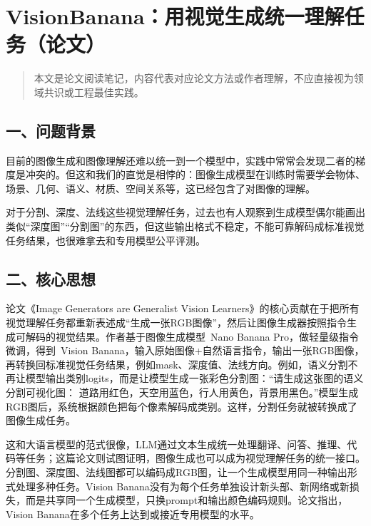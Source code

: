 \hypertarget{visionbananaux7528ux89c6ux89c9ux751fux6210ux7edfux4e00ux7406ux89e3ux4efbux52a1ux8bbaux6587}{%
\section{VisionBanana：用视觉生成统一理解任务（论文）}\label{visionbananaux7528ux89c6ux89c9ux751fux6210ux7edfux4e00ux7406ux89e3ux4efbux52a1ux8bbaux6587}}

\begin{quote}
本文是论文阅读笔记，内容代表对应论文方法或作者理解，不应直接视为领域共识或工程最佳实践。
\end{quote}

\hypertarget{ux4e00ux95eeux9898ux80ccux666f-15}{%
\subsection{一、问题背景}\label{ux4e00ux95eeux9898ux80ccux666f-15}}

目前的图像生成和图像理解还难以统一到一个模型中，实践中常常会发现二者的梯度是冲突的。但这和我们的直觉是相悖的：图像生成模型在训练时需要学会物体、场景、几何、语义、材质、空间关系等，这已经包含了对图像的理解。

对于分割、深度、法线这些视觉理解任务，过去也有人观察到生成模型偶尔能画出类似``深度图''``分割图''的东西，但这些输出格式不稳定，不能可靠解码成标准视觉任务结果，也很难拿去和专用模型公平评测。

\hypertarget{ux4e8cux6838ux5fc3ux601dux60f3-7}{%
\subsection{二、核心思想}\label{ux4e8cux6838ux5fc3ux601dux60f3-7}}

论文《Image Generators are Generalist Vision Learners》的核心贡献在于把所有视觉理解任务都重新表述成``生成一张RGB图像''，然后让图像生成器按照指令生成可解码的视觉结果。作者基于图像生成模型~Nano Banana Pro，做轻量级指令微调，得到~Vision Banana，输入原始图像+自然语言指令，输出一张RGB图像，再转换回标准视觉任务结果，例如mask、深度值、法线方向。例如，语义分割不再让模型输出类别logits，而是让模型生成一张彩色分割图：``请生成这张图的语义分割可视化图： 道路用红色，天空用蓝色，行人用黄色，背景用黑色。''模型生成RGB图后，系统根据颜色把每个像素解码成类别。这样，分割任务就被转换成了图像生成任务。

这和大语言模型的范式很像，LLM通过文本生成统一处理翻译、问答、推理、代码等任务；这篇论文则试图证明，图像生成也可以成为视觉理解任务的统一接口。分割图、深度图、法线图都可以编码成RGB图，让一个生成模型用同一种输出形式处理多种任务。Vision Banana没有为每个任务单独设计新头部、新网络或新损失，而是共享同一个生成模型，只换prompt和输出颜色编码规则。论文指出，Vision Banana在多个任务上达到或接近专用模型的水平。

